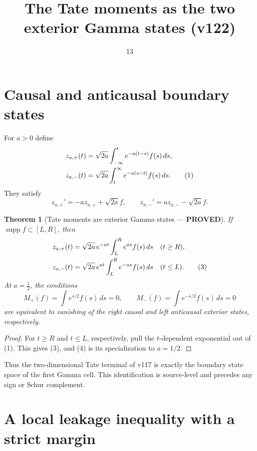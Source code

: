 \documentclass[11pt]{article}
\title{The Tate moments as the two exterior Gamma states (v122)}
\date{13}
\newcommand{\PROVED}{\textcolor{green!40!black}{\textbf{PROVED}}}
\newtheorem{theorem}{Theorem}
\begin{document}
\maketitle

\section{Causal and anticausal boundary states}

For $a>0$ define
\begin{align}
 z_{a,+}(t)&=\sqrt{2a}\int_{-\infty}^t
                  e^{-a(t-s)}f(s)\,ds,\notag\\
 z_{a,-}(t)&=\sqrt{2a}\int_t^\infty
                  e^{-a(s-t)}f(s)\,ds.                       \tag{1}
\end{align}
They satisfy
\begin{equation}
 z_{a,+}'=-az_{a,+}+\sqrt{2a}f,\qquad
 z_{a,-}'=az_{a,-}-\sqrt{2a}f.                              \tag{2}
\end{equation}

\begin{theorem}[Tate moments are exterior Gamma states --- \PROVED]
If $\operatorname{supp}f\subset[L,R]$, then
\begin{align}
 z_{a,+}(t)&=\sqrt{2a}\,e^{-at}
       \int_L^Re^{as}f(s)\,ds &&(t\ge R),\notag\\
 z_{a,-}(t)&=\sqrt{2a}\,e^{at}
       \int_L^Re^{-as}f(s)\,ds &&(t\le L).                   \tag{3}
\end{align}
At $a=\frac12$, the conditions
\begin{equation}
 M_+(f)=\int e^{s/2}f(s)\,ds=0,\qquad
 M_-(f)=\int e^{-s/2}f(s)\,ds=0                             \tag{4}
\end{equation}
are equivalent to vanishing of the right causal and left anticausal
exterior states, respectively.
\end{theorem}

\begin{proof}
For $t\ge R$ and $t\le L$, respectively, pull the $t$-dependent exponential
out of (1).  This gives (3), and (4) is its specialization to $a=1/2$.
\end{proof}

Thus the two-dimensional Tate terminal of v117 is exactly the boundary
state space of the first Gamma cell.  This identification is source-level
and precedes any sign or Schur complement.

\section{A local leakage inequality with a strict margin}
\end{document}

